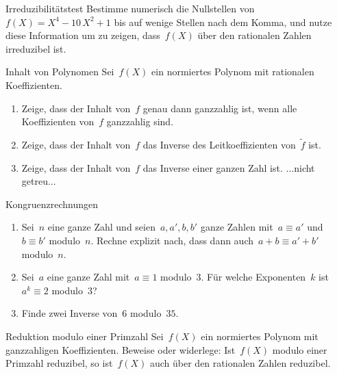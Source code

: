 \documentclass{algblatt}
\begin{document}
\vspace*{-1.5cm}

\begin{aufgabe}{Irreduzibilitätstest}
Bestimme numerisch die Nullstellen von~$f(X) = X^4 - 10\,X^2 + 1$ bis auf
wenige Stellen nach dem Komma, und nutze diese Information um zu zeigen,
dass~$f(X)$ über den rationalen Zahlen irreduzibel ist.
\end{aufgabe}

\begin{aufgabe}{Inhalt von Polynomen}
Sei~$f(X)$ ein normiertes Polynom mit rationalen Koeffizienten.
\begin{enumerate}
\item Zeige, dass der Inhalt von~$f$ genau dann ganzzahlig ist, wenn alle
Koeffizienten von~$f$ ganzzahlig sind.
\item Zeige, dass der Inhalt von~$f$ das Inverse des Leitkoeffizienten
von~$\widetilde f$ ist.
\item Zeige, dass der Inhalt von~$f$ das Inverse einer ganzen Zahl ist.
...nicht getreu...
\end{enumerate}
\end{aufgabe}

\begin{aufgabe}{Kongruenzrechnungen}
\begin{enumerate}
\item Sei~$n$ eine ganze Zahl und seien~$a,a', b,b'$ ganze Zahlen mit~$a \equiv
a'$ und~$b \equiv b'$ modulo~$n$. Rechne explizit nach, dass dann auch~$a+b
\equiv a'+b'$ modulo~$n$.
\item Sei~$a$ eine ganze Zahl mit~$a \equiv 1$ modulo~$3$. Für welche
Exponenten~$k$ ist~$a^k \equiv 2$ modulo~$3$?
\item Finde zwei Inverse von~$6$ modulo~$35$.
\end{enumerate}
\end{aufgabe}

\begin{aufgabe}{Reduktion modulo einer Primzahl}
Sei~$f(X)$ ein normiertes Polynom mit ganzzahligen Koeffizienten. Beweise oder
widerlege: Ist~$f(X)$ modulo einer Primzahl reduzibel, so ist~$f(X)$ auch über
den rationalen Zahlen reduzibel.
\end{aufgabe}
\end{document}
